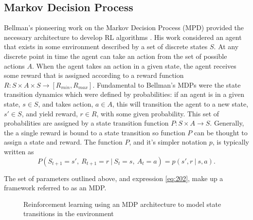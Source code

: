 \subsection{Markov Decision Process}
Bellman's pioneering work on the Markov Decision Process (MPD) provided the necessary architecture to develop RL algorithms \cite{Bellm1957}. His work considered an agent that exists in some environment described by a set of discrete states $S$. At any discrete point in time the agent can take an action from the set of possible actions $A$. When the agent takes an action in a given state, the agent receives some reward that is assigned according to a reward function $R: S \times A \times S \to [R_{min}, R_{max}]$. Fundamental to Bellman's MDPs were the state transition dynamics which were defined by probabilities: if an agent is in a given state, $s \in S$, and takes action, $a \in A$, this will transition the agent to a new state, $s' \in S$, and yield reward, $r \in R$, with some given probability. This set of probabilities are assigned by a state transition function $P: S \times A \to S$. Generally, the a single reward is bound to a state transition so function $P$ can be thought to assign a state and reward. The function $P$, and it's simpler notation $p$, is typically written as
\begin{equation}
	P(S_{t+1} = s', \ R_{t+1} = r \ | \ S_t = s, \ A_t = a) = p(s', r \ | \ s, a). \label{eq:202}
\end{equation}

The set of parameters outlined above, and expression \ref{eq:202}, make up a framework referred to as an MDP.

\begin{figure}[h]
\centering

\caption[MDP model of reinforcement learning]{Reinforcement learning using an MDP architecture to model state transitions in the environment}
\label{fig:210_reinforcement_learning_problem_mdp}
\end{figure}


